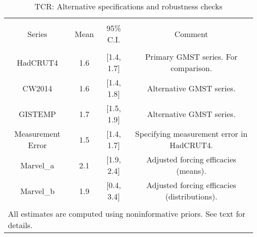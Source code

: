 
\begin{table}[!htbp] \centering 
  \caption{TCR: Alternative specifications and robustness checks} 
  \label{tab:tcr-robust} 
\begin{tabular}{@{\extracolsep{5pt}} cccc} 
\\[-1.8ex]\hline 
\hline \\[-1.8ex] 
Series & Mean & 95\% C.I. & Comment \\ 
\hline \\[-1.8ex] 
HadCRUT4 & 1.6 & [1.4, 1.7] & Primary GMST series. For comparison. \\ 
CW2014 & 1.6 & [1.4, 1.8] & Alternative GMST series. \\ 
GISTEMP & 1.7 & [1.5, 1.9] & Alternative GMST series. \\ 
Measurement Error & 1.5 & [1.4, 1.7] & Specifying measurement error in HadCRUT4. \\ 
Marvel\_a & 2.1 & [1.9, 2.4] & Adjusted forcing efficacies (means). \\ 
Marvel\_b & 1.9 & [0.4, 3.4] & Adjusted forcing efficacies (distributions). \\ 
\hline \\[-1.8ex] 
\multicolumn{4}{l}{\footnotesize All estimates are computed using noninformative priors. See text for details.} \\ 
\end{tabular} 
\end{table} 
